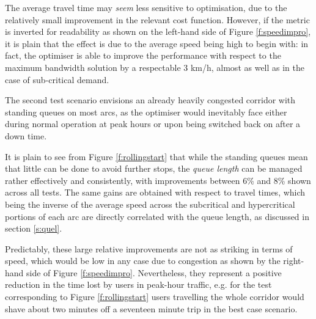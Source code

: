The average travel time may \emph{seem} less sensitive to optimisation, due to the relatively small improvement in the relevant cost function. However, if the metric is inverted for readability as shown on the left-hand side of Figure \ref{f:speedimpro}, it is plain that the effect is due to the average speed being high to begin with: in fact, the optimiser is able to improve the performance with respect to the maximum bandwidth solution by a respectable 3 km/h, almost as well as in the case of sub-critical demand.


The second test scenario envisions an already heavily congested corridor with standing queues on most arcs, as the optimiser would inevitably face either during normal operation at peak hours or upon being switched back on after a down time. 

It is plain to see from Figure \ref{f:rollingstart} that while the standing queues mean that little can be done to avoid further stops, the \emph{queue length} can be managed rather effectively and consistently, with improvements between 6\% and 8\% shown across all tests. The same gains are obtained with respect to travel times, which being the inverse of the average speed across the subcritical and hypercritical portions of each arc are directly correlated with the queue length, as discussed in section \ref{s:quel}.

Predictably, these large relative improvements are not as striking in terms of speed, which would be low in any case due to congestion as shown by the right-hand side of Figure \ref{f:speedimpro}. Nevertheless, they represent a positive reduction in the time lost by users in peak-hour traffic, e.g. for the test corresponding to Figure \ref{f:rollingstart} users travelling the whole corridor would shave about two minutes off a seventeen minute trip in the best case scenario.



